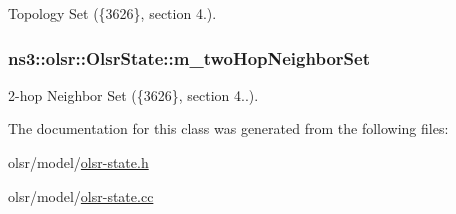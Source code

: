 Topology Set (\{3626\}, section 4.). 

\subsubsection[{\texorpdfstring{m\+\_\+two\+Hop\+Neighbor\+Set}{m_twoHopNeighborSet}}]{ ns3\+::olsr\+::\+Olsr\+State\+::m\+\_\+two\+Hop\+Neighbor\+Set\hspace{0.3cm}{\ttfamily [protected]}}\hypertarget{classns3_1_1olsr_1_1OlsrState_aa0c379d77bf47a6ded88a4ce20f1fc9d}{}\label{classns3_1_1olsr_1_1OlsrState_aa0c379d77bf47a6ded88a4ce20f1fc9d}


2-\/hop Neighbor Set (\{3626\}, section 4..). 



The documentation for this class was generated from the following files\+:\begin{DoxyCompactItemize}
\item 
olsr/model/\hyperlink{olsr-state_8h}{olsr-\/state.\+h}\item 
olsr/model/\hyperlink{olsr-state_8cc}{olsr-\/state.\+cc}\end{DoxyCompactItemize}
